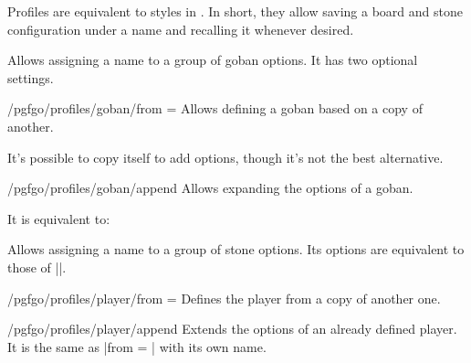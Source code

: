 \begin{goban}[9, stone = {radius = 4pt}, mark = {line = {color = red}}]
Profiles are equivalent to styles in \tikzname. In short, they allow saving a board and stone configuration under a name and recalling it whenever desired.

\begin{command}{\pgfgodefinegoban{}}
	Allows assigning a name to a group of goban options. It has two optional settings.
	
	\begin{key}{/pgfgo/profiles/goban/from = }
		Allows defining a goban based on a copy of another.
		\begin{codeexample}
		\end{codeexample}
		
		It’s possible to copy itself to add options, though it’s not the best alternative.
		\begin{codeexample}
		\end{codeexample}
	\end{key}
	
	\begin{key}{/pgfgo/profiles/goban/append}
		Allows expanding the options of a goban.
		\begin{codeexample}
		\end{codeexample}
		It is equivalent to:
		\begin{codeexample}
		\end{codeexample}
	\end{key}
\end{command}

\begin{command}{\pgfgodefineplayer{}}
	Allows assigning a name to a group of stone options. Its options are equivalent to those of |\pgfgodefinegoban|.

	\begin{key}{/pgfgo/profiles/player/from = }
		Defines the player from a copy of another one.
	\end{key}

	\begin{key}{/pgfgo/profiles/player/append}
		Extends the options of an already defined player. It is the same as |from = | with its own name.
	\end{key}
\end{command}


\end{goban}
